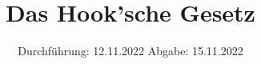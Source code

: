 

\subject{Übung 4}
\title{Das Hook'sche Gesetz}
\date{%
  Durchführung: 12.11.2022
  \hspace{3em}
  Abgabe: 15.11.2022
}



\maketitle
\thispagestyle{empty}
\tableofcontents
\newpage





\printbibliography{}


